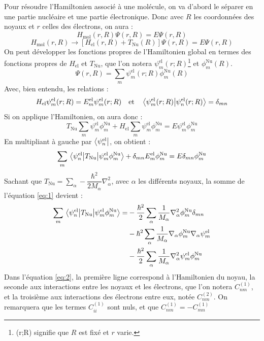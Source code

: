 Pour résoudre l'Hamiltonien associé à une molécule, on va d'abord le séparer en une partie nucléaire et une partie électronique. Donc avec $R$ les coordonnées des noyaux et $r$ celles des électrons, on aura :
\[
H_\text{mol}(r,R)  \Psi(r,R) = E\Psi(r,R)
\]
\[
H_\text{mol}(r,R) \to [H_\text{el}(r,R) + T_\text{Nu}(R)]\Psi(r,R) = E\Psi(r,R)
\]
On peut développer les fonctions propres de l'Hamiltonien global en termes des fonctions propres de $H_\text{el}$ et $T_\text{Nu}$, que l'on notera $\psi^\text{el}_m(r;R)$\footnote{(r;R) signifie que $R$ est fixé et $r$ varie.} et $\phi^\text{Nu}_m(R)$.
\[
\Psi(r,R) = \sum\limits_m \psi^\text{el}_m(r;R) \phi^\text{Nu}_m(R)
\]
Avec, bien entendu, les relations :
\[
H_\text{el}\psi^\text{el}_m(r;R) = E^\text{el}_m\psi^\text{el}_m(r;R) \quad \textrm{et} \quad \braket{\psi^\text{el}_m(r;R)}{\psi^\text{el}_n(r;R)} = \delta_{mn}
\]
Si on applique l'Hamiltonien, on aura donc :
\[
T_\text{Nu} \sum\limits_m \psi^\text{el}_m \phi^\text{Nu}_m + H_\text{el}\sum\limits_m \psi^\text{el}_m \phi^\text{Nu}_m  = E\psi^\text{el}_m\phi^\text{Nu}_m
\]
En multipliant à gauche par $\bra{\psi^\text{el}_n}$, on obtient :
\begin{equation}\label{eq:1}
\sum\limits_m \mel{\psi^\text{el}_n}{T_\text{Nu}}{\psi^\text{el}_m \phi^\text{Nu}_m} + \delta_{mn}E^\text{el}_m\phi^\text{Nu}_m = E \delta_{mn}\phi^\text{Nu}_m
\end{equation}
Sachant que $T_\text{Nu} = \sum\limits_{\alpha}-\dfrac{\hbar^2}{2M_{\alpha}}\nabla_{\alpha}^2$, avec $\alpha$ les différents noyaux, la somme de l'équation \ref{eq:1} devient :
\begin{equation}\label{eq:2}
\begin{split}
\sum\limits_m \mel{\psi^\text{el}_n}{T_\text{Nu}}{\psi^\text{el}_m \phi^\text{Nu}_m} = & - \dfrac{\hbar^2}{2}\sum\limits_{\alpha}\dfrac{1}{M_{\alpha}}\nabla_{\alpha}^2\phi^\text{Nu}_m\delta_{mn} \\
& - \hbar^2\sum\limits_{\alpha}\dfrac{1}{M_{\alpha}}\nabla_{\alpha}\phi^\text{Nu}_m\nabla_{\alpha}\psi^\text{el}_m \\
& - \dfrac{\hbar^2}{2}\sum\limits_{\alpha}\dfrac{1}{M_{\alpha}}\nabla_{\alpha}^2\psi^\text{el}_m\phi^\text{Nu}_m
\end{split}
\end{equation}
Dans l'équation \ref{eq:2}, la première ligne correspond à l'Hamiltonien du noyau, la seconde aux interactions entre les noyaux et les électrons, que l'on notera $C_{nm}^{(1)}$, et la troisième aux interactions des électrons entre eux, notée $C_{nm}^{(2)}$. On remarquera que les termes $C_{ii}^{(1)}$ sont nuls, et que $C_{nm}^{(1)} = - C_{mn}^{(1)}$
